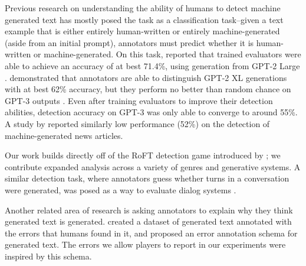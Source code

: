 Previous research on understanding the ability of humans to detect machine generated text has mostly posed the task as a classification task--given a text example that is either entirely human-written or entirely machine-generated (aside from an initial prompt), annotators must predict whether it is human-written or machine-generated.
On this task, \citet{ippolito2020automatic} reported that trained evaluators were able to achieve an accuracy of at best 71.4\%, using generation from GPT-2 Large \citep{radford2019language}.
\citet{clark2021all} demonstrated that annotators are able to distinguish GPT-2 XL generations with at best 62\% accuracy, but they perform no better than random chance on GPT-3 outputs \citep{brown2020language}.
Even after training evaluators to improve their detection abilities, detection accuracy on GPT-3 was only able to converge to around 55\%.
A study by \citet{brown2020language} reported similarly low performance (52\%) on the detection of machine-generated news articles.

Our work builds directly off of the RoFT detection game introduced by \citet{dugan2020roft}; we contribute expanded analysis across a variety of genres and generative systems.
A similar detection task, where annotators guess whether turns in a conversation were generated, was posed as a way to evaluate dialog systems \citep{deriu2020spot}.

Another related area of research is asking annotators to explain why they think generated text is generated.
\citet{he2021tgea} created a dataset of generated text annotated with the errors that humans found in it, and \citet{dou2021scarecrow} proposed an error annotation schema for generated text.
The errors we allow players to report in our experiments were inspired by this schema.


